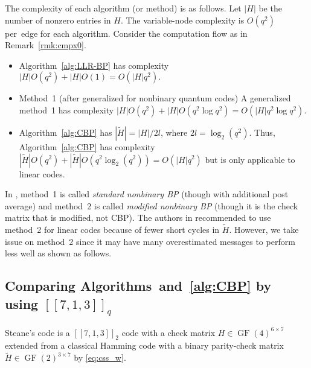 \documentclass{ieeeaccess}
\DeclareMathOperator{\GF}{GF}
\let\emph\textit
\theoremstyle{definition}		%
\begin{document}
	The complexity of each algorithm (or method) is as follows.  
	Let $|H|$ be the number of nonzero entries in $H$.
	The variable-node complexity is $ O(q^2) $ per~edge for each algorithm.
	Consider the computation flow as in Remark~\ref{rmk:cmpx0}.
		\begin{itemize}
		\item 
		Algorithm~\ref{alg:LLR-BP}  has complexity $ |H|O(q^2) + |H|O(1) = O(|H|q^2) .$
		\item
		Method~1 (after generalized for nonbinary quantum codes) 
		A generalized method~1
		has complexity $ |H|O(q^2) + |H|O(q^2\log q^2) = O(|H|q^2\log q^2) .$
		\item
		Algorithm~\ref{alg:CBP} has $ |\tilde H| = |H|/2l $, where ${ 2l = \log_2(q^2) }$. 
			Thus, Algorithm~\ref{alg:CBP} %
			has complexity $ |\tilde H|O(q^2) + |\tilde H|O(q^2\log_2(q^2)) = O(|H|q^2) $
			but is only applicable to linear codes.
		\end{itemize}

In \cite{Bab+15}, method~1 is called \emph{standard nonbinary BP} (though with additional post average) 
and method~2 is called \emph{modified nonbinary BP} (though it is  the check matrix  that is modified, not CBP).
The authors in \cite{Bab+15} recommended to use method~2 for linear codes because of fewer short cycles in $\tilde H$.
However, we take issue on method~2 since it may have many overestimated messages to perform less well as shown as follows.





\newcommand*\refCBP{\ref{alg:CBP} }																	%
\newcommand*\SEVENq{$[[7,1,3]]_q$ }																	%
\subsection*{Comparing Algorithms~\protect{} and~\protect\refCBP by using \protect\SEVENq}	%

Steane's code \cite{Steane96} is a $[[7,1,3]]_2$ code with a check matrix  $H\in\GF(4)^{6\times 7}$ extended from a classical Hamming code with a binary parity-check matrix $\tilde H\in\GF(2)^{3\times 7}$ by \eqref{eq:css_w}.
\end{document}
